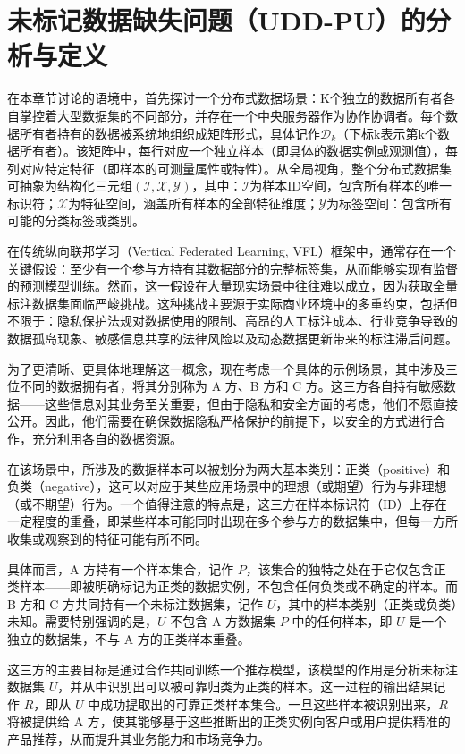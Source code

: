 \section{未标记数据缺失问题（UDD-PU）的分析与定义}
在本章节讨论的语境中，首先探讨一个分布式数据场景：K个独立的数据所有者各自掌控着大型数据集的不同部分，并存在一个中央服务器作为协作协调者。每个数据所有者持有的数据被系统地组织成矩阵形式，具体记作${{\mathsf{\mathcal{D}}}_{k}}$（下标k表示第k个数据所有者）。该矩阵中，每行对应一个独立样本（即具体的数据实例或观测值），每列对应特定特征（即样本的可测量属性或特性）。从全局视角，整个分布式数据集可抽象为结构化三元组$(\mathsf{\mathcal{I}}, \mathsf{\mathcal{X}}, \mathsf{\mathcal{Y}})$，其中：$\mathsf{\mathcal{I}}$为样本ID空间，包含所有样本的唯一标识符；$\mathsf{\mathcal{X}}$为特征空间，涵盖所有样本的全部特征维度；$\mathsf{\mathcal{Y}}$为标签空间：包含所有可能的分类标签或类别。

在传统纵向联邦学习（Vertical Federated Learning, VFL）框架中，通常存在一个关键假设：至少有一个参与方持有其数据部分的完整标签集，从而能够实现有监督的预测模型训练。然而，这一假设在大量现实场景中往往难以成立，因为获取全量标注数据集面临严峻挑战。这种挑战主要源于实际商业环境中的多重约束，包括但不限于：隐私保护法规对数据使用的限制、高昂的人工标注成本、行业竞争导致的数据孤岛现象、敏感信息共享的法律风险以及动态数据更新带来的标注滞后问题。

为了更清晰、更具体地理解这一概念，现在考虑一个具体的示例场景，其中涉及三位不同的数据拥有者，将其分别称为 A 方、B 方和 C 方。这三方各自持有敏感数据——这些信息对其业务至关重要，但由于隐私和安全方面的考虑，他们不愿直接公开。因此，他们需要在确保数据隐私严格保护的前提下，以安全的方式进行合作，充分利用各自的数据资源。

在该场景中，所涉及的数据样本可以被划分为两大基本类别：正类（positive）和负类（negative），这可以对应于某些应用场景中的理想（或期望）行为与非理想（或不期望）行为。一个值得注意的特点是，这三方在样本标识符（ID）上存在一定程度的重叠，即某些样本可能同时出现在多个参与方的数据集中，但每一方所收集或观察到的特征可能有所不同。

具体而言，A 方持有一个样本集合，记作 $ P $，该集合的独特之处在于它仅包含正类样本——即被明确标记为正类的数据实例，不包含任何负类或不确定的样本。而 B 方和 C 方共同持有一个未标注数据集，记作 $ U $，其中的样本类别（正类或负类）未知。需要特别强调的是，$ U $ 不包含 A 方数据集 $ P $ 中的任何样本，即 $ U $ 是一个独立的数据集，不与 A 方的正类样本重叠。

这三方的主要目标是通过合作共同训练一个推荐模型，该模型的作用是分析未标注数据集 $ U $，并从中识别出可以被可靠归类为正类的样本。这一过程的输出结果记作 $ R $，即从 $ U $ 中成功提取出的可靠正类样本集合。一旦这些样本被识别出来，$ R $ 将被提供给 A 方，使其能够基于这些推断出的正类实例向客户或用户提供精准的产品推荐，从而提升其业务能力和市场竞争力。

